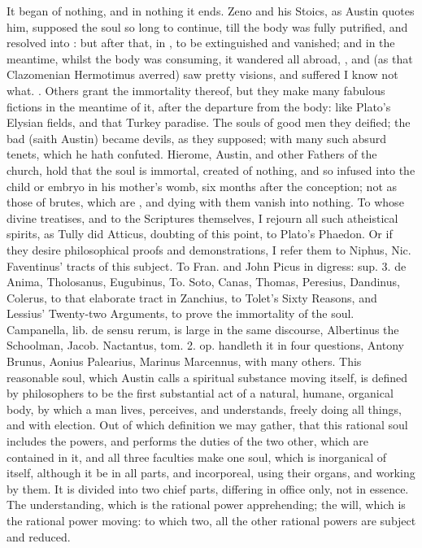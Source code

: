 {It began of nothing, and in nothing it ends. Zeno and his Stoics, as
Austin quotes him, supposed the soul so long to continue, till
the body was fully putrified, and resolved into : but
after that, in , to be extinguished and vanished; and
in the meantime, whilst the body was consuming, it wandered all abroad,
, and (as that Clazomenian Hermotimus
averred) saw pretty visions, and suffered I know not what. .
Others grant the immortality thereof, but they make many fabulous
fictions in the meantime of it, after the departure from the body: like
Plato's Elysian fields, and that Turkey paradise. The souls of good men
they deified; the bad (saith Austin) became devils, as they
supposed; with many such absurd tenets, which he hath confuted.
Hierome, Austin, and other Fathers of the church, hold that the soul is
immortal, created of nothing, and so infused into the child or embryo
in his mother's womb, six months after the conception; not as
those of brutes, which are , and dying with them vanish into
nothing. To whose divine treatises, and to the Scriptures themselves, I
rejourn all such atheistical spirits, as Tully did Atticus, doubting of
this point, to Plato's Phaedon. Or if they desire philosophical proofs
and demonstrations, I refer them to Niphus, Nic. Faventinus' tracts of
this subject. To Fran. and John Picus in digress: sup. 3. de Anima,
Tholosanus, Eugubinus, To. Soto, Canas, Thomas, Peresius, Dandinus,
Colerus, to that elaborate tract in Zanchius, to Tolet's Sixty Reasons,
and Lessius' Twenty-two Arguments, to prove the immortality of the
soul. Campanella, lib. de sensu rerum, is large in the same discourse,
Albertinus the Schoolman, Jacob. Nactantus, tom. 2. op. handleth it in
four questions, Antony Brunus, Aonius Palearius, Marinus Marcennus,
with many others. This reasonable soul, which Austin calls a spiritual
substance moving itself, is defined by philosophers to be the first
substantial act of a natural, humane, organical body, by which a man
lives, perceives, and understands, freely doing all things, and with
election. Out of which definition we may gather, that this rational
soul includes the powers, and performs the duties of the two other,
which are contained in it, and all three faculties make one soul, which
is inorganical of itself, although it be in all parts, and incorporeal,
using their organs, and working by them. It is divided into two chief
parts, differing in office only, not in essence. The understanding,
which is the rational power apprehending; the will, which is the
rational power moving: to which two, all the other rational powers are
subject and reduced.

}
